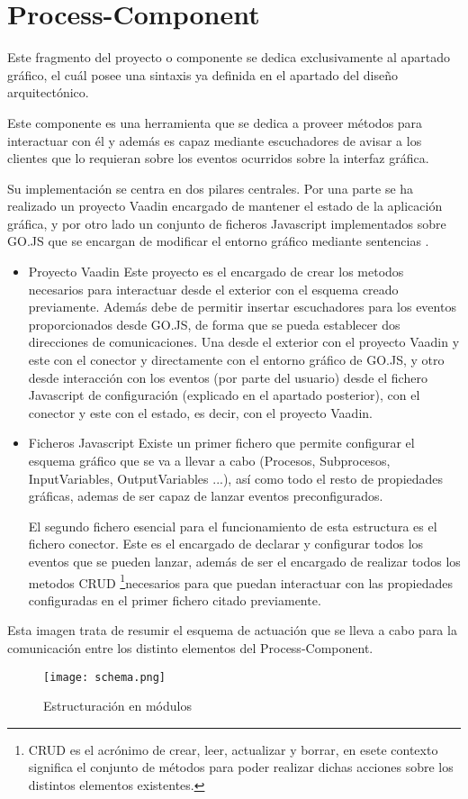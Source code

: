 \chapter{Process-Component}
	

	

Este fragmento del proyecto o componente se dedica exclusivamente al apartado gráfico, el cuál posee una sintaxis ya definida en el apartado del diseño arquitectónico.



Este componente es una herramienta que se dedica a proveer métodos para interactuar con él y además es capaz mediante escuchadores de avisar a los clientes que lo requieran sobre los eventos ocurridos sobre la interfaz gráfica.


Su implementación se centra en dos pilares centrales. Por una parte se ha realizado un proyecto Vaadin encargado de mantener el estado de la aplicación gráfica, y por otro lado un conjunto de ficheros Javascript implementados sobre GO.JS que se encargan de modificar el entorno gráfico mediante sentencias .
\begin{itemize}
	\item Proyecto Vaadin
	\subitem Este proyecto es el encargado de crear los metodos necesarios para interactuar desde el exterior con el esquema creado previamente. Además debe de permitir insertar escuchadores para los eventos proporcionados desde GO.JS, de forma que se pueda establecer dos direcciones de comunicaciones. Una desde el exterior con el proyecto Vaadin y este con el conector y directamente con el entorno gráfico de GO.JS, y otro desde interacción con los eventos (por parte del usuario) desde el fichero Javascript de configuración (explicado en el apartado posterior), con el conector y este con el estado, es decir, con el proyecto Vaadin.
	
	\item Ficheros Javascript
	\subitem Existe un primer fichero que permite configurar el esquema gráfico que se va a llevar a cabo (Procesos, Subprocesos, InputVariables, OutputVariables ...), así como todo el resto de propiedades gráficas, ademas de ser capaz de lanzar eventos preconfigurados.
	
	
	El segundo fichero esencial para el funcionamiento de esta estructura es el fichero conector. Este es el encargado de declarar y configurar todos los eventos que se pueden lanzar, además de ser el encargado de realizar todos los metodos CRUD \footnote{CRUD es el acrónimo de crear, leer, actualizar y borrar, en esete contexto significa el conjunto de métodos para poder realizar dichas acciones sobre los distintos elementos existentes.}necesarios para que puedan interactuar con las propiedades configuradas en el primer fichero citado previamente.
\end{itemize}

Esta imagen trata de  resumir el esquema de actuación que se lleva a cabo para la comunicación entre los distinto elementos del Process-Component.

\begin{figure}[H]
	\centering
	\texttt{[image: schema.png]}
	\caption{Estructuración en módulos}\label{fig:schema}
\end{figure}